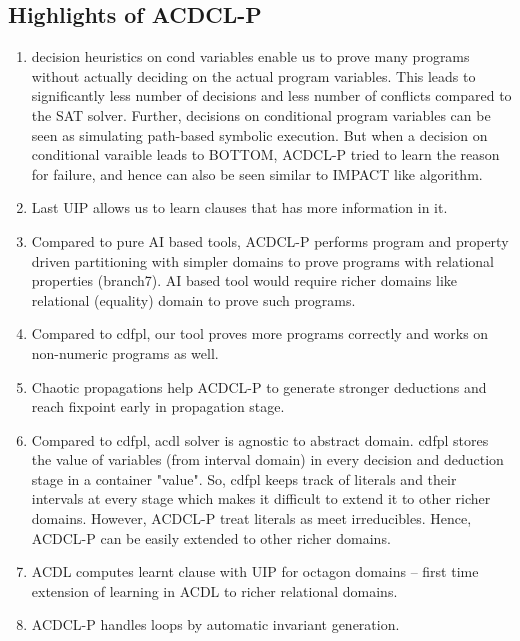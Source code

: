 \documentclass[a4paper,conference]{llncs}
\begin{document}
\subsection{Highlights of ACDCL-P}
\begin{enumerate}
\item decision heuristics on cond variables enable us to prove many 
programs without actually deciding on the actual program variables. This 
leads to significantly less number of decisions and less number of conflicts 
compared to the SAT solver. Further, decisions on conditional program 
variables can be seen as simulating path-based symbolic execution. But when 
a decision on conditional varaible leads to BOTTOM, ACDCL-P tried to learn 
the reason for failure, and hence can also be seen similar to IMPACT like
algorithm. 
\item Last UIP allows us to learn clauses that has more information in it. 
\item Compared to pure AI based tools, ACDCL-P performs program and property 
driven partitioning with simpler domains to prove programs with relational 
properties (branch7). AI based tool would require richer domains like 
relational (equality) domain to prove such programs. 
\item Compared to cdfpl, our tool proves more programs correctly and works on 
non-numeric programs as well.
\item Chaotic propagations help ACDCL-P to generate stronger deductions and reach 
fixpoint early in propagation stage.
\item Compared to cdfpl, acdl solver is agnostic to abstract domain. cdfpl
stores the value of variables (from interval domain) in every decision 
and deduction stage in a container "value". So, cdfpl keeps track of literals 
and their intervals at every stage which makes it difficult to extend it to other 
richer domains. However, ACDCL-P treat literals as meet irreducibles. Hence, 
ACDCL-P can be easily extended to other richer domains.    
\item  ACDL computes learnt clause with UIP for octagon domains -- first time 
extension of learning in ACDL to richer relational domains.   
\item ACDCL-P handles loops by automatic invariant generation.
\end{enumerate}
\end{document}
